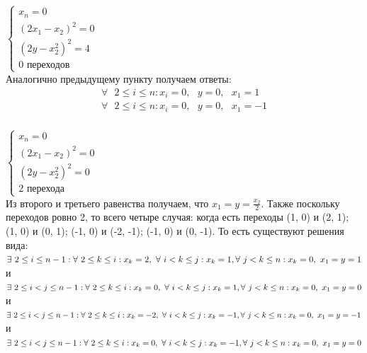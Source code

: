 \documentclass[12pt, a4paper]{article}
\begin{document}
{        \subsubsection{} 
            $
            \begin{cases}
                x_n=0\\
                (2x_1-x_2)^2=0\\
                (2y-x_2^2)^2=4\\
                0 \text { переходов}
            \end{cases}
            $\\
            Аналогично предыдущему пункту получаем ответы:
            \begin{gather*}
            \forall \text{ } 2 \leq i \leq n : x_i=0, \text{ } y = 0, \text{ } x_1 = 1
            \\
            \forall \text{ } 2 \leq i \leq n : x_i=0, \text{ } y = 0, \text{ } x_1 = -1
            \end{gather*}
        \subsubsection{}
            $
                \begin{cases}
                    x_n = 0\\
                    (2x_1-x_2)^2=0\\
                    (2y-x_2^2)^2=0\\
                    2 \text { перехода}
                \end{cases}
            $\\
            Из второго и третьего равенства получаем, что $x_1=y=\frac{x_2}{2}$.
            Также поскольку переходов ровно 2, то всего четыре случая: когда есть переходы (1, 0) и (2, 1); (1, 0) и (0, 1); (-1, 0) и (-2, -1); (-1, 0) и (0, -1). То есть существуют решения вида:\\
            $
            \exists \text{ } 2 \leq i \leq n-1 : \forall \text{ } 2 \leq k \leq i : x_k=2, \text{ } \forall \text{ } i < k \leq j : x_k = 1, \\ \forall \text{ } j < k \leq n : x_k=0, \text{ } x_1=y=1 
            $ \\ и \\
            $
            \exists \text{ } 2 \leq i < j \leq n-1 : \forall \text{ } 2 \leq k \leq i : x_k=0, \text{ } \forall \text{ } i < k \leq j : x_k = 1, \\ \forall \text{ } j < k \leq n : x_k=0, \text{ } x_1=y=0
            $\\ и \\
            $
            \exists \text{ } 2 \leq i < j \leq n-1 : \forall \text{ } 2 \leq k \leq i : x_k=-2, \text{ } \forall \text{ } i < k \leq j : x_k = -1, \\ \forall \text{ } j < k \leq n : x_k=0, \text{ } x_1=y=-1 
            $\\ и \\
            $
            \exists \text{ } 2 \leq i < j \leq n-1 : \forall \text{ } 2 \leq k \leq i : x_k=0, \text{ } \forall \text{ } i < k \leq j : x_k = -1, \\ \forall \text{ } j < k \leq n : x_k=0, \text{ } x_1=y=0 
            $
}
\end{document}
